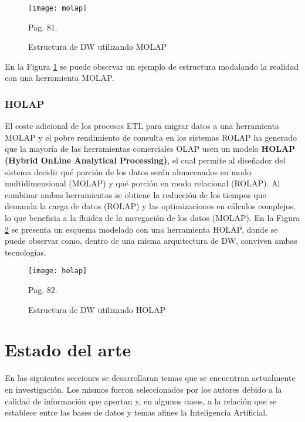 \documentclass[a4paper,11pt]{article}
\begin{document}
    \begin{figure}
      \begin{center}
        \texttt{[image: molap]}
        \caption{Estructura de DW utilizando MOLAP} \cite{nagabhushana} Pag. 81.
        \label{molap}
      \end{center}
    \end{figure}
    
    En la Figura \ref{molap} se puede observar un ejemplo de estructura modalando la realidad con una herramienta MOLAP.
    
    \subsubsection{HOLAP}

    El coste adicional de los procesos ETL para migrar datos a una herramienta MOLAP y el pobre rendimiento de consulta en los sistemas ROLAP ha generado que la
    mayoría de las herramientas comerciales OLAP usen un modelo \textbf{HOLAP (Hybrid OnLine Analytical Processing)}, el cual permite al diseñador del sistema
    decidir qué porción de los datos serán almacenados en modo multidimensional (MOLAP) y qué porción en modo relacional (ROLAP). Al combinar ambas herramientas
    se obtiene la reducción de los tiempos que demanda la carga de datos (ROLAP) y las optimizaciones en cálculos complejos, lo que beneficia a la fluidez de la
    navegación de los datos (MOLAP). En la Figura \ref{holap} se presenta un esquema modelado con una herramienta HOLAP, donde se puede observar como, dentro de
    una misma arquitectura de DW, conviven ambas tecnologías.
    
    \begin{figure}
      \begin{center}
        \texttt{[image: holap]}
        \caption{Estructura de DW utilizando HOLAP} \cite{nagabhushana} Pag. 82.
        \label{holap}
      \end{center}
    \end{figure}
    
    
    
    \section{Estado del arte}
    
    En las siguientes secciones se desarrollaran temas que se encuentran actualmente en investigación. Los mismos fueron seleccionados por los autores
    debido a la calidad de información que aportan y, en algunos casos, a la relación que se establece entre las bases de datos y temas afines la
    Inteligencia Artificial.
    
\end{document}
